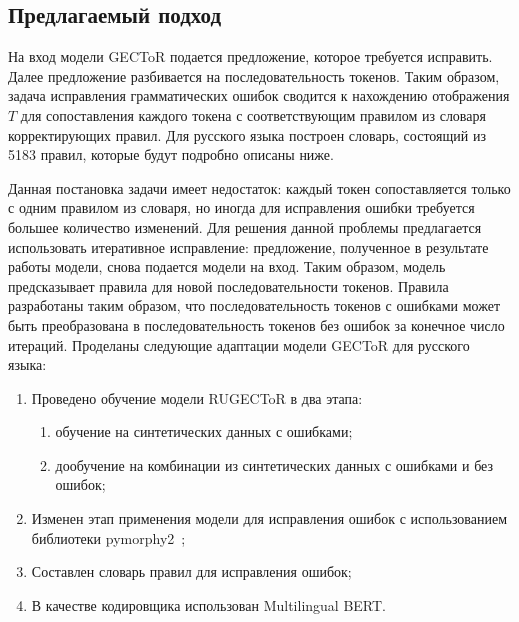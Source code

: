 \newpage

\subsection{Предлагаемый подход}

На вход модели GECToR подается предложение, которое требуется исправить. Далее предложение разбивается на последовательность токенов. Таким образом, задача исправления грамматических ошибок сводится к нахождению отображения \( T \) для сопоставления каждого токена с соответствующим правилом из словаря корректирующих правил. Для русского языка построен словарь, состоящий из 5183 правил, которые будут подробно описаны ниже.

Данная постановка задачи имеет недостаток: каждый токен сопоставляется только с одним правилом из словаря, но иногда для исправления ошибки требуется большее количество изменений. Для решения данной проблемы предлагается использовать итеративное исправление: предложение, полученное в результате работы модели, снова подается модели на вход. Таким образом, модель предсказывает правила для новой последовательности токенов. Правила разработаны таким образом, что последовательность токенов с ошибками может быть преобразована в последовательность токенов без ошибок за конечное число итераций. Проделаны следующие адаптации модели GECToR для русского языка:


\begin{enumerate}
    \item Проведено обучение модели RUGECToR в два этапа:
    \begin{enumerate}
        \item обучение на синтетических данных с ошибками;
        \item дообучение на комбинации из синтетических данных с ошибками и без ошибок;
    \end{enumerate}
    
    \item Изменен этап применения модели для исправления ошибок с использованием библиотеки pymorphy2~\cite{b23};
    
    \item Составлен словарь правил для исправления ошибок;
    
    \item В качестве кодировщика использован Multilingual BERT.

    
\end{enumerate}